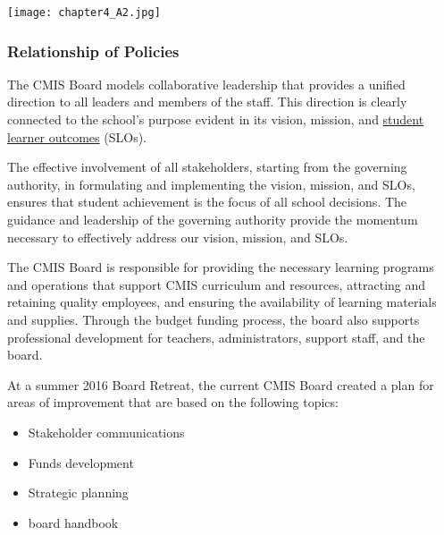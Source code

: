 {\centering\texttt{[image: chapter4\_A2.jpg]}}

\subsubsection{Relationship of Policies}



\begin{findings}
The CMIS Board models collaborative leadership that provides a unified direction to all leaders and members of the staff. This direction is clearly connected to the school’s purpose evident in its vision, mission, and \href{https://docs.google.com/document/d/1bIbV9pgGz2vpXYJdnRzL_Od5PS35egy7lgBOBuszgD4/edit}{student learner outcomes} (SLOs).

The effective involvement of all stakeholders, starting from the governing authority, in formulating and implementing the vision, mission, and SLOs, ensures that student achievement is the focus of all school decisions. The guidance and leadership of the governing authority provide the momentum necessary to effectively address our vision, mission, and SLOs.

The CMIS Board is responsible for providing the necessary learning programs and operations that support CMIS curriculum and resources, attracting and retaining quality employees, and ensuring the availability of learning materials and supplies. Through the budget funding process, the board also supports professional development for teachers, administrators, support staff, and the board.

At a summer 2016 Board Retreat, the current CMIS Board created a plan for areas of improvement that are based on the following topics: 

\begin{itemize}
\item Stakeholder communications
\item Funds development
\item Strategic planning
\item board handbook
\end{itemize}


\end{findings}
